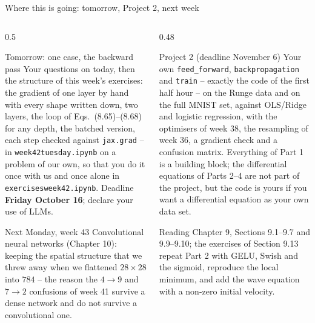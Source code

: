 \documentclass[10pt,aspectratio=169]{beamer}
\begin{document}
\begin{frame}{Where this is going: tomorrow, Project 2, next week}
\small
\begin{columns}[T]
\begin{column}{0.5\textwidth}
\begin{block}{Tomorrow: one case, the backward pass}
\footnotesize
Your questions on today, then the structure of this week's exercises: the
gradient of one layer by hand with every shape written down, two layers,
the loop of Eqs.~(8.65)--(8.68) for any depth, the batched version, each
step checked against \texttt{jax.grad} -- in \texttt{week42tuesday.ipynb}
on a problem of our own, so that you do it once with us and once alone in
\texttt{exercisesweek42.ipynb}.  Deadline \textbf{Friday October 16};
declare your use of LLMs.
\end{block}
\begin{block}{Next Monday, week 43}
\footnotesize
Convolutional neural networks (Chapter 10): keeping the spatial structure
that we threw away when we flattened $28\times28$ into $784$ -- the reason
the $4\to9$ and $7\to2$ confusions of week 41 survive a dense network and
do not survive a convolutional one.
\end{block}
\end{column}
\begin{column}{0.48\textwidth}
\begin{block}{Project 2 (deadline November 6)}
\footnotesize
Your own \texttt{feed\_forward}, \texttt{backpropagation} and
\texttt{train} -- exactly the code of the first half hour -- on the Runge
data and on the full MNIST set, against OLS/Ridge and logistic regression,
with the optimisers of week 38, the resampling of week 36, a gradient check
and a confusion matrix.  Everything of Part 1 is a building block; the
differential equations of Parts 2--4 are not part of the project, but the
code is yours if you want a differential equation as your own data set.
\end{block}
\begin{block}{Reading}
\footnotesize
Chapter 9, Sections 9.1--9.7 and 9.9--9.10; the exercises of Section 9.13
repeat Part 2 with GELU, Swish and the sigmoid, reproduce the local minimum,
and add the wave equation with a non-zero initial velocity.
\end{block}
\end{column}
\end{columns}
\end{frame}

\end{document}
